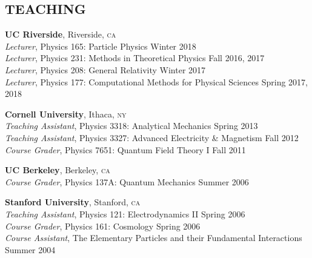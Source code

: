\documentclass[margin,line]{resume}
\newcommand{\scap}[1]{\textsc{\MakeLowercase{#1}}}
\begin{document}
\begin{resume}
\section{\footnotesize \sc
\sffamily 
{}
TEACHING
}

\textbf{UC Riverside}, Riverside, \scap{CA}
\\
\vspace{0mm}%
%
\textsl{Lecturer}, Physics 165: Particle Physics
\hfill {Winter 2018}\\
\vspace{0mm}%
%
\textsl{Lecturer}, Physics 231: Methods in Theoretical Physics
\hfill {Fall 2016, 2017}\\
\vspace{0mm}%
%
\textsl{Lecturer}, Physics 208: General Relativity
\hfill {Winter 2017}\\
%
\textsl{Lecturer}, Physics 177: Computational Methods for Physical Sciences
\hfill {Spring 2017, 2018}%

\textbf{Cornell University}, Ithaca, \scap{NY} 
\\
\vspace{0mm}%
%
\textsl{Teaching Assistant}, Physics 3318: Analytical Mechanics 
\hfill {Spring 2013}\\
\vspace{0mm}%
%
\textsl{Teaching Assistant}, Physics 3327: Advanced Electricity \& Magnetism 
\hfill {Fall 2012}\\
\vspace{0mm}%
%
\textsl{Course Grader}, Physics 7651: Quantum Field Theory I 
\hfill {Fall 2011}




\textbf{UC Berkeley}, Berkeley, \scap{CA} 
\\
\vspace{0mm}%
%
\textsl{Course Grader}, Physics 137A: Quantum Mechanics 
\hfill {Summer 2006}



\textbf{Stanford University}, Stanford, \scap{CA} 
\\
\vspace{0mm}%
\textsl{Teaching Assistant}, Physics 121: Electrodynamics II 
\hfill {Spring 2006}\\
%
\textsl{Course Grader}, Physics 161: Cosmology 
\hfill {Spring 2006}\\
%	
\textsl{Course Assistant}, The Elementary Particles and their Fundamental Interactions 
\hfill {Summer 2004}\\
\vspace{-3mm}


\end{resume}
\end{document}
